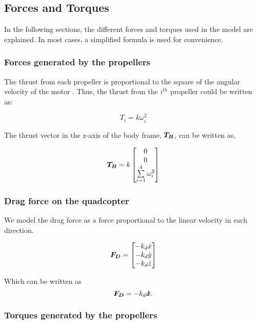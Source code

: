 \documentclass[12pt,fleqn]{article}
\newcommand{\mbm}[1]{\mbox{\boldmath $#1$}}
\begin{document}
\subsection{Forces and Torques}

In the following sections, the different forces and torques used in
the model are explained. In most cases, a simplified formula is used
for convenience. 

\subsubsection{Forces generated by the propellers}

The thrust from each propeller is proportional to the square of the
angular velocity of the motor \cite{Andrew}. Thus, the thrust from the
$i^{th}$ propeller could be written as:

$$ T_i = k\omega_i^2 $$

The thrust vector in the z-axis of the body frame, $\mbm{T_{B}}$, can
be written as, 

\begin{equation} \label{thrust}
$$ \mbm{T_{B}} = k \begin{bmatrix}0 \\ 0\\ \sum \limits_{i=1}^{4}
  \omega_i^2 \end{bmatrix} $$
\end{equation}

\subsubsection{Drag force on the quadcopter}
We model the drag force as a force proportional to the linear velocity
in each direction. 

$$ \mbm{F_D} = \begin{bmatrix} -k_d\dot{x}\\ -k_d\dot{y}\\
  -k_d\dot{z} \end{bmatrix} $$

Which can be written as 
\begin{equation} \label{dragforce}
$$ \mbm{F_D}= -k_d\mbm{\dot{x}}$$.
\end{equation}

\subsubsection{Torques generated by the propellers}
\end{document}
